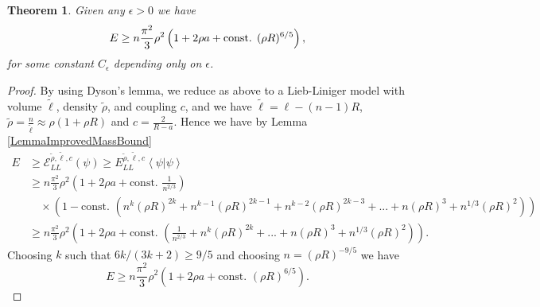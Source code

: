 \documentclass[a4paper,11pt]{article}
\renewcommand{\braket}[1]{\left\langle#1\right\rangle}
\newtheorem{theorem}{Theorem}
\numberwithin{equation}{section}
\begin{document}
		\begin{theorem}
		Given any $ \epsilon>0 $ we have \begin{equation}
		E\geq n\frac{\pi^2}{3}\rho^2\left(1+2\rho a+\textnormal{const. }(\rho R)^{6/5}\right),
		\end{equation}
		for some constant $ C_\epsilon $ depending only on $ \epsilon $.
	\end{theorem}
	\begin{proof}
		By using Dyson's lemma, we reduce as above to a Lieb-Liniger model with volume $ \tilde{\ell} $, density $ \tilde{\rho} $, and coupling $ c $, and we have $ \tilde{\ell}=\ell-(n-1)R $, $ \tilde{\rho}=\frac{n}{\tilde{\ell}}\approx\rho (1+\rho R) $ and $ c=\frac{2}{R-a} $. Hence we have by Lemma \ref{LemmaImprovedMassBound} \begin{equation}
		\begin{aligned}
		E&\geq \mathcal{E}_{LL}^{\tilde{\rho},\tilde{\ell},c}(\psi)\geq E_{LL}^{\tilde{\rho},\tilde{\ell},c}\braket{\psi|\psi}\\&\geq
		n\frac{\pi^2}{3}\rho^2\left(1+2\rho a+\text{const. }\frac{1}{n^{2/3}}\right)\\&\quad\times\left(1-\text{const. }\left(n^k(\rho R)^{2k}+n^{k-1}(\rho R)^{2k-1}+n^{k-2}(\rho R)^{2k-3}+...+n(\rho R)^3+n^{1/3}(\rho R)^2\right)\right)\\
		&\geq n\frac{\pi^2}{3}\rho^2\left(1+2\rho a+\text{const. }\left(\frac{1}{n^{2/3}}+n^k(\rho R)^{2k}+...+n(\rho R)^3+n^{1/3}(\rho R)^{2}\right)\right).
		\end{aligned}
		\end{equation}
		Choosing $k$ such that $6k/(3k+2)\geq 9/5$ and choosing $ n=(\rho R)^{-9/5} $ we have \begin{equation}
		E\geq n\frac{\pi^2}{3}\rho^2\left(1+2\rho a+\text{const. }(\rho R)^{6/5}\right).
		\end{equation}
	\end{proof}
	
	
	
\end{document}

